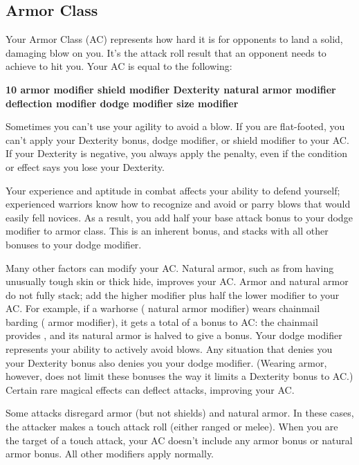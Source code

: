 \subsection{Armor Class}
Your Armor Class (AC) represents how hard it is for opponents to land a solid, damaging blow on you. It's the attack roll result that an opponent needs to achieve to hit you. Your AC is equal to the following:

{\centering \textbf{10 \add armor modifier \add shield modifier \add Dexterity \add natural armor modifier \add deflection modifier \add dodge modifier \add size modifier}}

Sometimes you can't use your agility to avoid a blow. If you are flat-footed, you can't apply your Dexterity bonus, dodge modifier, or shield modifier to your AC. If your Dexterity is negative, you always apply the penalty, even if the condition or effect says you lose your Dexterity.

 Your experience and aptitude in combat affects your ability to defend yourself; experienced warriors know how to recognize and avoid or parry blows that would easily fell novices. As a result, you add half your base attack bonus to your dodge modifier to armor class. This is an inherent bonus, and stacks with all other bonuses to your dodge modifier.

 Many other factors can modify your AC.
 Natural armor, such as from having unusually tough skin or thick hide, improves your AC. Armor and natural armor do not fully stack; add the higher modifier plus half the lower modifier to your AC. For example, if a warhorse ( natural armor modifier) wears chainmail barding ( armor modifier), it gets a total of a  bonus to AC: the chainmail provides , and its natural armor is halved to give a  bonus.
 Your dodge modifier represents your ability to actively avoid blows. Any situation that denies you your Dexterity bonus also denies you your dodge modifier. (Wearing armor, however, does not limit these bonuses the way it limits a Dexterity bonus to AC.)
 Certain rare magical effects can deflect attacks, improving your AC.

 Some attacks disregard armor (but not shields) and natural armor. In these cases, the attacker makes a touch attack roll (either ranged or melee). When you are the target of a touch attack, your AC doesn't include any armor bonus or natural armor bonus. All other modifiers apply normally.

